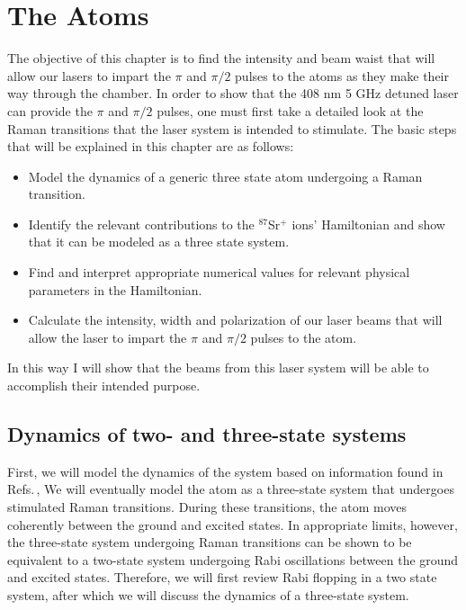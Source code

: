 \chapter{The Atoms} \label{ChapterAboutTheAtoms}

The objective of this chapter is to find the intensity and beam waist that will allow our lasers to impart the $\pi$ and $\pi/2$ pulses to the atoms as they make their way through the chamber. In order to show that the 408 nm 5 GHz detuned laser can provide the $\pi$ and $\pi/2$ pulses, one must first take a detailed look at the Raman transitions that the laser system is intended to stimulate.
The basic steps that will be explained in this chapter are as follows:
\begin{itemize}
\item Model the dynamics of a generic three state atom undergoing a Raman transition.
\item Identify the relevant contributions to the $^{87}$Sr$^+$ ions' Hamiltonian and show that it can be modeled as a three state system.
\item Find and interpret appropriate numerical values for relevant physical parameters in the Hamiltonian.
\item Calculate the intensity, width and polarization of our laser beams that will allow the laser to impart the $\pi$ and $\pi/2$ pulses to the atom. 
\end{itemize}
In this way I will show that the beams from this laser system will be able to accomplish their intended purpose.

\section{Dynamics of two- and three-state systems}\label{dynamicsSection}

First, we will model the dynamics of the system based on information found in Refs.\,\cite{Young1997363,gustavsonThesis,footAtomicPhysics,cjeDiss,RamanBeamSplit},
We will eventually model the atom as a three-state system that undergoes stimulated Raman transitions. During these transitions, the atom moves coherently between the ground and excited states. In appropriate limits, however, the three-state system undergoing Raman transitions can be shown to be equivalent to a two-state system undergoing Rabi oscillations between the ground and excited states. Therefore, we will first review Rabi flopping in a two state system, after which we will discuss the dynamics of a three-state system. 

